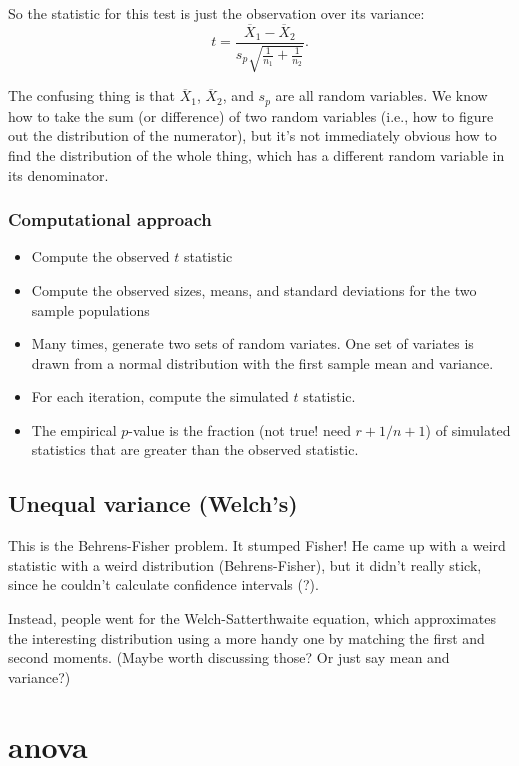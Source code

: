 \documentclass{book}
\providecommand{\tightlist}{%
  \setlength{\itemsep}{0pt}\setlength{\parskip}{0pt}}
\begin{document}
So the statistic for this test is just the observation over its
variance: \[
t = \frac{\overline{X}_1 - \overline{X}_2}{s_p \sqrt{\frac{1}{n_1} + \frac{1}{n_2}}}.
\]

The confusing thing is that \(\overline{X}_1\), \(\overline{X}_2\), and
\(s_p\) are all random variables. We know how to take the sum (or
difference) of two random variables (i.e., how to figure out the
distribution of the numerator), but it's not immediately obvious how to
find the distribution of the whole thing, which has a different random
variable in its denominator.

\subsubsection{Computational approach}\label{computational-approach}

\begin{itemize}
\tightlist
\item
  Compute the observed \(t\) statistic
\item
  Compute the observed sizes, means, and standard deviations for the two
  sample populations
\item
  Many times, generate two sets of random variates. One set of variates
  is drawn from a normal distribution with the first sample mean and
  variance.
\item
  For each iteration, compute the simulated \(t\) statistic.
\item
  The empirical \(p\)-value is the fraction (not true! need \(r+1/n+1\))
  of simulated statistics that are greater than the observed statistic.
\end{itemize}

\subsection{Unequal variance (Welch's)}\label{unequal-variance-welchs}

This is the Behrens-Fisher problem. It stumped Fisher! He came up with a
weird statistic with a weird distribution (Behrens-Fisher), but it
didn't really stick, since he couldn't calculate confidence intervals
(?).

Instead, people went for the Welch-Satterthwaite equation, which
approximates the interesting distribution using a more handy one by
matching the first and second moments. (Maybe worth discussing those? Or
just say mean and variance?)

\section{anova}\label{anova}
\end{document}

